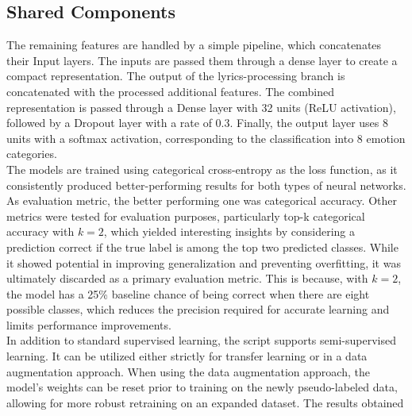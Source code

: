 \subsection*{Shared Components}
The remaining features are handled by a simple pipeline, which concatenates
their Input layers.
The inputs are passed them through a dense layer to create a compact
representation.
The output of the lyrics-processing branch is concatenated with the processed
additional features.
The combined representation is passed through a Dense layer with 32 units
(ReLU activation), followed by a Dropout layer with a rate of 0.3.
Finally, the output layer uses 8 units with a softmax activation, corresponding
to the classification into 8 emotion categories.\\


The models are trained using categorical cross-entropy as the loss function,
as it consistently produced better-performing results for both types of
neural networks.
As evaluation metric, the better performing one was categorical accuracy.
Other metrics were tested for evaluation purposes, particularly
top-k categorical accuracy with $k=2$, which yielded interesting insights
by considering a prediction correct if the true label is among the top two
predicted classes. While it showed potential in improving generalization and
preventing overfitting, it was ultimately discarded as a primary evaluation
metric. This is because, with $k=2$, the model has a 25\% baseline
chance of being correct when there are eight possible classes, which reduces
the precision required for accurate learning and limits performance improvements.\\

In addition to standard supervised learning, the script supports semi-supervised
learning. It can be utilized either strictly for transfer learning or in a data
augmentation approach. When using the data augmentation approach, the model's
weights can be reset prior to training on the newly pseudo-labeled data, allowing
for more robust retraining on an expanded dataset.
The results obtained 